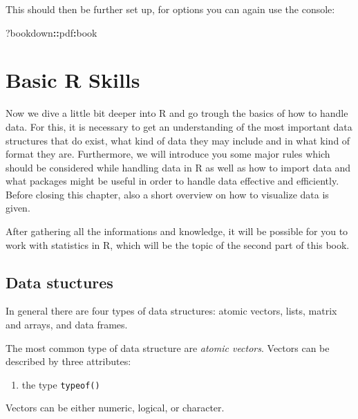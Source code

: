 \documentclass[]{report}
\newenvironment{Shaded}{\begin{snugshade}}{\end{snugshade}}
\newcommand{\OperatorTok}[1]{\textcolor[rgb]{0.81,0.36,0.00}{\textbf{#1}}}
\newcommand{\NormalTok}[1]{#1}
\providecommand{\tightlist}{%
  \setlength{\itemsep}{0pt}\setlength{\parskip}{0pt}}
\begin{document}
This should then be further set up, for options you can again use the
console:

\begin{Shaded}
\begin{Highlighting}[]
\NormalTok{?bookdown}\OperatorTok{::}\NormalTok{pdf}\OperatorTok{:}\NormalTok{book}
\end{Highlighting}
\end{Shaded}

\chapter{Basic R Skills}\label{basic-r-skills}

Now we dive a little bit deeper into R and go trough the basics of how
to handle data. For this, it is necessary to get an understanding of the
most important data structures that do exist, what kind of data they may
include and in what kind of format they are. Furthermore, we will
introduce you some major rules which should be considered while handling
data in R as well as how to import data and what packages might be
useful in order to handle data effective and efficiently. Before closing
this chapter, also a short overview on how to visualize data is given.

After gathering all the informations and knowledge, it will be possible
for you to work with statistics in R, which will be the topic of the
second part of this book.

\section{Data stuctures}\label{data-stuctures}

In general there are four types of data structures: atomic vectors,
lists, matrix and arrays, and data frames.

The most common type of data structure are \emph{atomic vectors}.
Vectors can be described by three attributes:

\begin{enumerate}
\def\labelenumi{\arabic{enumi}.}
\tightlist
\item
  the type \texttt{typeof()}
\end{enumerate}

Vectors can be either numeric, logical, or character.
\end{document}
